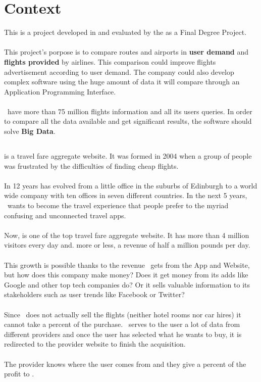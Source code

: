 
\chapter{Context}

\label{chapter01}

This is a project developed in \textit{\company} and evaluated by the \textit{\univname} as a Final Degree Project.
\\\\
This project's porpose is to compare routes and airports in \textbf{user demand} and \textbf{flights provided} by airlines. This comparison could improve flights advertisement according to user demand. The company could also develop complex software using the huge amount of data it will compare through an Application Programming Interface.
\\\\
\company\ have more than 75 million flights information and all its users queries. In order to compare all the data available and get significant results, the software should solve  \textbf{Big Data}.


\section{\company}

\company\cite{skyscanner_strategy} is a travel fare aggregate website. It was formed in 2004 when a group of people was frustrated by the difficulties of finding cheap flights.
\\\\
In 12 years has evolved from a little office in the suburbs of Edinburgh to a world wide company with ten offices in seven different countries. In the next 5 years, \company\ wants to become the travel experience that people prefer to the myriad confusing and unconnected travel apps.
\\\\
Now, is one of the top travel fare aggregate website. It has more than 4 million visitors every day and. more or less, a revenue of half a million pounds per day.
\\\\
This growth is possible thanks to the revenue \company\ gets from the App and Website, but how does this company make money? Does it get money from its adds like Google and other top tech companies do? Or it sells valuable information to its stakeholders such as user trends like Facebook or Twitter?
\\\\
Since \company\ does not actually sell the flights (neither hotel rooms nor car hires) it cannot take a percent of the purchase. \company\ serves to the user a lot of data from different providers and once the user has selected what he wants to buy, it is redirected to the provider website to finish the acquisition.
\\\\
The provider knows where the user comes from and they give a percent of the profit to \company.

